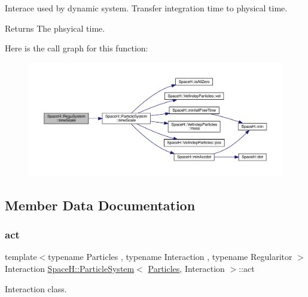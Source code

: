 Interace used by dynamic system. Transfer integration time to physical time. \begin{DoxyReturn}{Returns}
The phsyical time. 
\end{DoxyReturn}
Here is the call graph for this function\+:
\nopagebreak
\begin{figure}[H]
\begin{center}
\leavevmode
\includegraphics[width=350pt]{class_space_h_1_1_regu_system_a761c0dab5206189ba9e2abd19b1bce4f_cgraph}
\end{center}
\end{figure}


\subsection{Member Data Documentation}
\mbox{\label{class_space_h_1_1_regu_system_a9fa9c5d8996d8574f7fdd0b201f3383e}} 
\subsubsection{\texorpdfstring{act}{act}}
{\footnotesize\ttfamily template$<$typename Particles , typename Interaction , typename Regularitor $>$ \\
Interaction \mbox{\hyperlink{class_space_h_1_1_particle_system}{Space\+H\+::\+Particle\+System}}$<$ \mbox{\hyperlink{struct_space_h_1_1_particles}{Particles}}, Interaction $>$\+::act}



Interaction class. 

\mbox{\label{class_space_h_1_1_regu_system_aa82364f412d9de96503478f116b7b77b}} 
